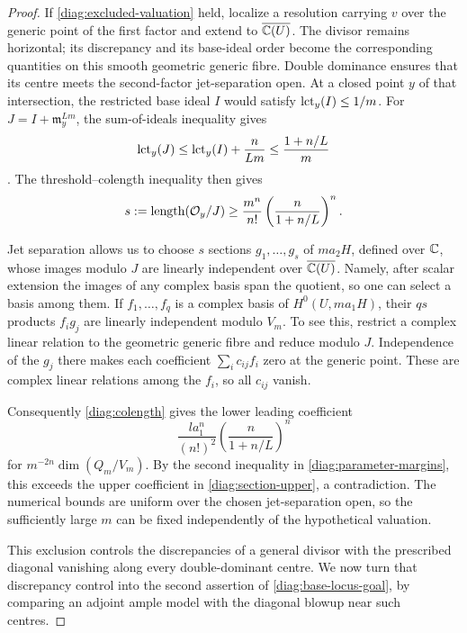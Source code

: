 \begin{proof}
If \eqref{diag:excluded-valuation} held, localize a resolution carrying
$v$ over the generic point of the first factor and extend to
$\overline{\mathbb C(U)}$.  The divisor remains horizontal; its discrepancy
and its base-ideal order become the corresponding quantities on this
smooth geometric generic fibre.  Double dominance ensures that its
centre meets the second-factor jet-separation open.  At a closed point
$y$ of that intersection, the restricted base ideal $I$ would satisfy
$\operatorname{lct}_y(I)\le1/m$.  For
$J=I+\mathfrak m_y^{Lm}$, the sum-of-ideals inequality gives
\[
 \operatorname{lct}_y(J)\le\operatorname{lct}_y(I)+\frac{n}{Lm}
             \le\frac{1+n/L}{m}
\]
\citep[Lemma~2.18]{dFEM2011}.  The threshold--colength inequality
\citep[Theorem~1.1]{dFEM2004} then gives
\begin{equation}\label{diag:colength}
 s:=\operatorname{length}(\mathcal O_y/J)
 \ge\frac{m^n}{n!}\left(\frac{n}{1+n/L}\right)^n.
\end{equation}

Jet separation allows us to choose $s$ sections $g_1,\ldots,g_s$ of
$ma_2H$, defined over $\mathbb C$, whose images modulo $J$ are linearly
independent over $\overline{\mathbb C(U)}$.  Namely, after scalar extension the
images of any complex basis span the quotient, so one can select a
basis among them.  If $f_1,\ldots,f_q$ is a complex basis of
$H^0(U,ma_1H)$, their $qs$ products $f_i g_j$ are linearly independent
modulo $V_m$.  To see this, restrict a complex linear relation to the
geometric generic fibre and reduce modulo $J$.  Independence of the
$g_j$ there makes each coefficient $\sum_i c_{ij}f_i$ zero at the
generic point.  These are complex linear relations among the $f_i$,
so all $c_{ij}$ vanish.

Consequently \eqref{diag:colength} gives the lower leading coefficient
\[
 \frac{l a_1^n}{(n!)^2}
       \left(\frac{n}{1+n/L}\right)^n
\]
for $m^{-2n}\dim(Q_m/V_m)$.  By the second inequality in
\eqref{diag:parameter-margins}, this exceeds the upper coefficient in
\eqref{diag:section-upper}, a contradiction.  The numerical bounds are
uniform over the chosen jet-separation open, so the sufficiently large
$m$ can be fixed independently of the hypothetical valuation.

This exclusion controls the discrepancies of a general divisor with the
prescribed diagonal vanishing along every double-dominant centre.  We now
turn that discrepancy control into the second assertion of
\eqref{diag:base-locus-goal}, by comparing an adjoint ample model with the
diagonal blowup near such centres.


\end{proof}
